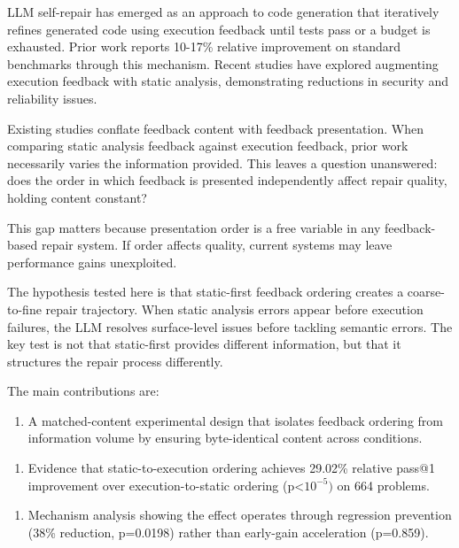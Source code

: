 
LLM self-repair has emerged as an approach to code generation that iteratively refines generated code using execution feedback until tests pass or a budget is exhausted. Prior work reports 10-17\% relative improvement on standard benchmarks through this mechanism. Recent studies have explored augmenting execution feedback with static analysis, demonstrating reductions in security and reliability issues.

Existing studies conflate feedback content with feedback presentation. When comparing static analysis feedback against execution feedback, prior work necessarily varies the information provided. This leaves a question unanswered: does the order in which feedback is presented independently affect repair quality, holding content constant?

This gap matters because presentation order is a free variable in any feedback-based repair system. If order affects quality, current systems may leave performance gains unexploited.

The hypothesis tested here is that static-first feedback ordering creates a coarse-to-fine repair trajectory. When static analysis errors appear before execution failures, the LLM resolves surface-level issues before tackling semantic errors. The key test is not that static-first provides different information, but that it structures the repair process differently.

The main contributions are:

\begin{enumerate}
\item A matched-content experimental design that isolates feedback ordering from information volume by ensuring byte-identical content across conditions.
\end{enumerate}

\begin{enumerate}
\item Evidence that static-to-execution ordering achieves 29.02\% relative pass@1 improvement over execution-to-static ordering (p<$10^{-5})$ on 664 problems.
\end{enumerate}

\begin{enumerate}
\item Mechanism analysis showing the effect operates through regression prevention (38\% reduction, p=0.0198) rather than early-gain acceleration (p=0.859).
\end{enumerate}


